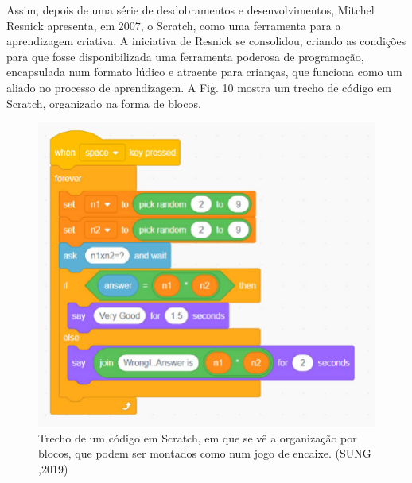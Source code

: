 \noindent\begin{flushright}\mbox{\linespread{1}\selectfont\centering{}}\end{flushright}


Assim, depois de uma série de desdobramentos e desenvolvimentos, Mitchel Resnick apresenta, em 2007, o Scratch, como uma ferramenta para a aprendizagem criativa. A iniciativa de Resnick se consolidou, criando as condições para que fosse disponibilizada uma ferramenta poderosa de programação, encapsulada num formato lúdico e atraente para crianças, que funciona como um aliado no processo de aprendizagem. A Fig. 10 mostra um trecho de código em Scratch, organizado na forma de blocos.



\captionsetup{format=plain}
\begin{figure}[htb]

\centering


\begin{minipage}[b]{0.4\linewidth}
        \centering
                \includegraphics[width=1.0\linewidth]{../../../imagens/Scratch-Block.png}
                \caption{Trecho de um código em Scratch, em que se vê a organização por blocos, que podem ser montados como num jogo de encaixe. (SUNG ,2019)}
                \label{5cac9c9edeb34a88b5571069bb494cda1ce1bd9c}
\end{minipage}%
\hspace{0.5cm}
\end{figure}



